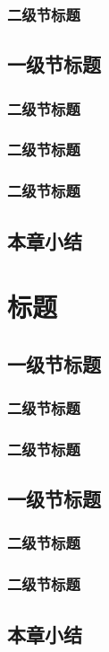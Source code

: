 \documentclass{swjtuthesis}
\begin{document}
\subsection{二级节标题}
\section{一级节标题}
\subsection{二级节标题}
\subsection{二级节标题}
\subsection{二级节标题}
\section{本章小结}

\chapter{标题}
\section{一级节标题}
\subsection{二级节标题}
\subsection{二级节标题}
\section{一级节标题}
\subsection{二级节标题}
\subsection{二级节标题}
\section{本章小结}

\makebackmatter
\end{document}
